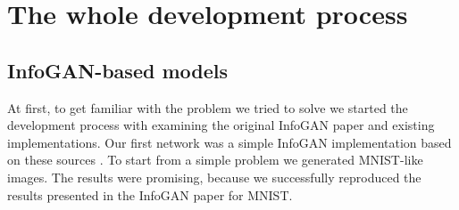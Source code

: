 \documentclass[10pt,journal,compsoc]{IEEEtran}
\begin{document}

%

\section{The whole development process}

\subsection{InfoGAN-based models}

At first, to get familiar with the problem we tried to solve we started the development process with examining the original InfoGAN paper and existing implementations. Our first network was a simple InfoGAN implementation based on these sources \cite{chen2016infogan}. To start from a simple problem we generated MNIST-like images. The results were promising, because we successfully reproduced the results presented in the InfoGAN paper for MNIST.
\end{document}
